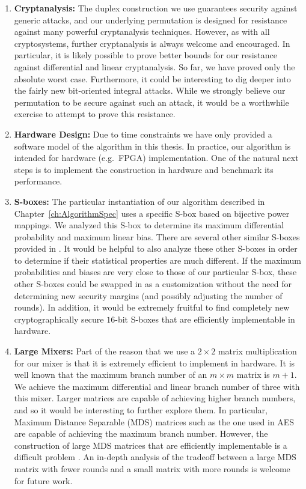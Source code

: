 \begin{enumerate}
\item \textbf{Cryptanalysis:}
The duplex construction we use guarantees security against generic attacks, and our underlying permutation is designed for resistance against many powerful cryptanalysis techniques.
However, as with all cryptosystems, further cryptanalysis is always welcome and encouraged.
In particular, it is likely possible to prove better bounds for our resistance against differential and linear cryptanalysis.
So far, we have proved only the absolute worst case.
Furthermore, it could be interesting to dig deeper into the fairly new bit-oriented integral attacks.
While we strongly believe our permutation to be secure against such an attack, it would be a worthwhile exercise to attempt to prove this resistance.

\item \textbf{Hardware Design:} 
Due to time constraints we have only provided a software model of the algorithm in this thesis.
In practice, our algorithm is intended for hardware (e.g.\ FPGA) implementation.
One of the natural next steps is to implement the construction in hardware and benchmark its performance.

\item \textbf{S-boxes:} 
The particular instantiation of our algorithm described in Chapter~\ref{ch:AlgorithmSpec} uses a specific S-box based on bijective power mappings. 
We analyzed this S-box to determine its maximum differential probability and maximum linear bias.
There are several other similar S-boxes provided in \cite{Wood2013_SboxThesis}.
It would be helpful to also analyze these other S-boxes in order to determine if their statistical properties are much different.
If the maximum probabilities and biases are very close to those of our particular S-box, these other S-boxes could be swapped in as a customization without the need for determining new security margins (and possibly adjusting the number of rounds).
In addition, it would be extremely fruitful to find completely new cryptographically secure $16$-bit S-boxes that are efficiently implementable in hardware.

\item \textbf{Large Mixers:}
Part of the reason that we use a $2 \times 2$ matrix multiplication for our mixer is that it is extremely efficient to implement in hardware.
It is well known that the maximum branch number of an $m \times m$ matrix is $m+1$. 
We achieve the maximum differential and linear branch number of three with this mixer.
Larger matrices are capable of achieving higher branch numbers, and so it would be interesting to further explore them.
In particular, Maximum Distance Separable (MDS) matrices such as the one used in AES are capable of achieving the maximum branch number.
However, the construction of large MDS matrices that are efficiently implementable is a difficult problem \cite{Daemen2001_WideTrail}.
An in-depth analysis of the tradeoff between a large MDS matrix with fewer rounds and a small matrix with more rounds is welcome for future work.


\end{enumerate}
